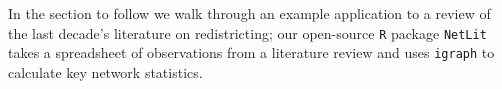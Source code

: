 \documentclass{cup-pan}
\begin{document}
In the section to follow we walk through an example application to a review of the last decade's literature on redistricting; our open-source \texttt{R} package \texttt{NetLit} takes a spreadsheet of observations from a literature review and uses \texttt{igraph} to calculate key network statistics.



\begin{comment}

\begin{enumerate}
    \item Helps us answer questions that we naturally have about these types of data, (and helps us answer questions that are \emph{difficult} to answer with these types of data) e.g.:
    \begin{itemize}
        \item Summarization of prior research and present a sense of how complete that knowledge is -- demarcated as the two key elements of a literature review in \citet{knopf_doing_2006}. $\rightarrow$ seeing global summaries and the full extent of a body of works as a whole can be aided through mapping the literature into physical network space.
        \item Key concepts $\rightarrow$ centrality
        \item Key communities of work $\rightarrow$ components
        \item Works that serve as communicators between communities of work that are not engaging with each other as much otherwise $\rightarrow$ hubs (?) \emph{hard to do without network approach}
        \item Under theorized conceptual relationships $\rightarrow$ unclosed or open triads and near-cliques. \emph{hard to do without network approach} "gap" in the literature: questions or perspectives that have not been undertaken
        \item Areas of consensus or near-consensus -- ``conventional wisdom'' \citep[][]{knopf_doing_2006}.
        \item Areas of disagreement or debate -- differential "schools of thought" 
        \item Under empirically validated conceptual relationships $\rightarrow$ edge differences between theoretical network and empirically validated network. "gap" in the literature: under or un-empirically validated conceptual relationships.

\end{comment}
\end{document}
